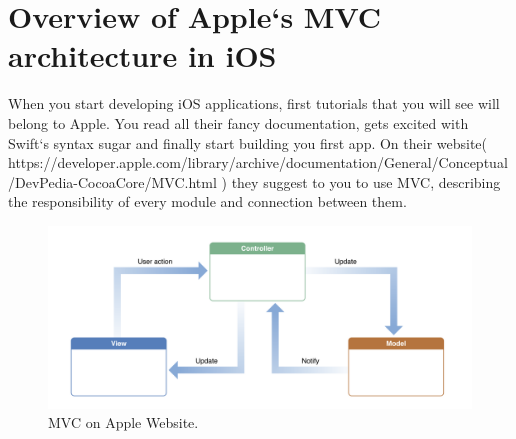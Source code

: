 \section{Overview of Apple`s MVC architecture in iOS}\label{sec:02}
When you start developing iOS applications, first tutorials that you will see will belong to Apple. You read all their fancy documentation, gets excited with Swift`s syntax sugar and finally start building you first app. On their website( https://developer.apple.com/library/archive/documentation/General/Conceptual/DevPedia-CocoaCore/MVC.html ) they suggest to you to use MVC, describing the responsibility of every module and connection between them.
	\begin{figure}[!htbp]
	\centering
	\includegraphics[width=0.95\linewidth]{sections/01-chapter/images/Controller.png}
	\caption{MVC on Apple Website.}\label{sec:01_01:fig:01}
	\end{figure}

